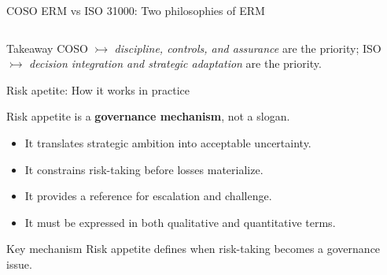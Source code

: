 \documentclass[aspectratio=169, 10pt]{beamer} %
\begin{document}
\begin{frame}{COSO ERM vs ISO 31000: Two philosophies of ERM}
\begin{columns}[T,onlytextwidth]
\end{columns}

\begin{block}{Takeaway}
COSO $\rightarrowtail $ \emph{discipline, controls, and assurance} are
the priority; ISO $\rightarrowtail $ \emph{decision integration and strategic
adaptation} are the priority. 
\end{block}

\end{frame}



\begin{frame}{Risk apetite: How it works in practice}

Risk appetite is a \textbf{governance mechanism}, not a slogan.

\medskip

\begin{itemize}
    \item It translates strategic ambition into acceptable uncertainty.
    
    \item It constrains risk-taking before losses materialize.
    
    \item It provides a reference for escalation and challenge.
    
    \item It must be expressed in both qualitative and quantitative terms.
\end{itemize}

\begin{block}{Key mechanism}
Risk appetite defines when risk-taking becomes a governance issue.
\end{block}

\end{frame}
\end{document}

